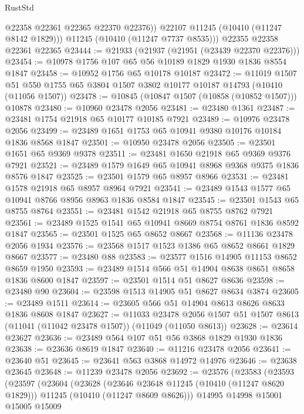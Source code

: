 \begin{lexlean}{RustStd}
\begin{coremodule}
            @22358
            @22361
            @22365
            @22370
            @22376))
        @22107
        @11245
        (@10410 (@11247 @8142 @1829)))
      @11245
      (@10410 (@11247 @7737 @8535)))
    @22355
    @22358
    @22361
    @22365
@23444 := @21933 (@21937 (@21951 (@23439 @22370 @22376)))
@23454 := @10978 @1756 @107 @65 @56 @10189 @1829 @1930 @1836 @8554 @1847
@23458 := @10952 @1756 @65 @10178 @10187
@23472 := @11019
    @1507
    @51
    @550
    @1755
    @65
    @3804
    @1507
    @3802
    @10177
    @10187
    @14793
    (@10410 (@11056 @1507))
@23478 := @10845 (@10847 @1507 (@10858 (@10852 @1507))) @10878
@23480 := @10960 @23478 @2056
@23481 := @23480 @1361
@23487 := @23481 @1754 @21918 @65 @10177 @10185 @7921
@23489 := @10976 @23478 @2056
@23499 := @23489 @1651 @1753 @65 @10941 @9380 @10176 @10184 @1836 @8568 @1847
@23501 := @10950 @23478 @2056
@23505 := @23501 @1651 @65 @9369 @9378
@23511 := @23481 @1650 @21918 @65 @9369 @9376 @7921
@23521 := @23489 @1579 @1649 @65 @10941 @8968 @9368 @9375 @1836 @8576 @1847
@23525 := @23501 @1579 @65 @8957 @8966
@23531 := @23481 @1578 @21918 @65 @8957 @8964 @7921
@23541 := @23489 @1543 @1577 @65 @10941 @8766 @8956 @8963 @1836 @8584 @1847
@23545 := @23501 @1543 @65 @8755 @8764
@23551 := @23481 @1542 @21918 @65 @8755 @8762 @7921
@23561 := @23489 @1525 @1541 @65 @10941 @8669 @8754 @8761 @1836 @8592 @1847
@23565 := @23501 @1525 @65 @8652 @8667
@23568 := @11136 @23478 @2056 @1934
@23576 := @23568 @1517 @1523 @1386 @65 @8652 @8661 @1829 @8667
@23577 := @23480 @88
@23583 := @23577 @1516 @14905 @11153 @8652 @8659 @1950
@23593 := @23489 @1514 @566 @51 @14904 @8638 @8651 @8658 @1836 @8600 @1847
@23597 := @23501 @1514 @51 @8627 @8636
@23598 := @23480 @90
@23604 := @23598 @1513 @14905 @51 @8627 @8634 @3874
@23605 := @23489 @1511
@23614 := @23605 @566 @51 @14904 @8613 @8626 @8633 @1836 @8608 @1847
@23627 := @11033
    @23478
    @2056
    @1507
    @51
    @1507
    @8613
    (@11041 (@11042 @23478 @1507))
    (@11049 (@11050 @8613))
@23628 := @23614 @23627
@23636 := @23489 @564 @107 @51 @56 @3868 @1829 @1930 @1836
@23638 := @23636 @8619 @1847
@23640 := @11216 @23478 @2056
@23641 := @23640 @51
@23645 := @23641 @563 @3868 @14972 @14976
@23646 := @23638 @23645
@23648 := @11239 @23478 @2056
@23692 := @23576
    (@23583
      (@23593
        (@23597
          (@23604
            (@23628
              (@23646 @23648 @11245 (@10410 (@11247 @8620 @1829)))
              @11245
              (@10410 (@11247 @8609 @8626)))
            @14995
            @14998
            @15001
            @15005
            @15009

\end{coremodule}
\end{lexlean}
